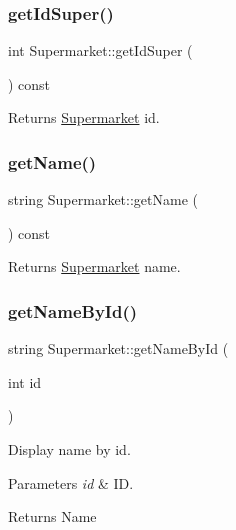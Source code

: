 \subsubsection{\texorpdfstring{get\+Id\+Super()}{getIdSuper()}}
{\footnotesize\ttfamily int Supermarket\+::get\+Id\+Super (\begin{DoxyParamCaption}{ }\end{DoxyParamCaption}) const}

\begin{DoxyReturn}{Returns}
\hyperlink{class_supermarket}{Supermarket} id. 
\end{DoxyReturn}
\mbox{\label{class_supermarket_a917fbd070f9b9740a57d6baedbe57bde}} 
\subsubsection{\texorpdfstring{get\+Name()}{getName()}}
{\footnotesize\ttfamily string Supermarket\+::get\+Name (\begin{DoxyParamCaption}{ }\end{DoxyParamCaption}) const}

\begin{DoxyReturn}{Returns}
\hyperlink{class_supermarket}{Supermarket} name. 
\end{DoxyReturn}
\mbox{\label{class_supermarket_a427143f25488b61db997b693fb9fed4b}} 
\subsubsection{\texorpdfstring{get\+Name\+By\+Id()}{getNameById()}}
{\footnotesize\ttfamily string Supermarket\+::get\+Name\+By\+Id (\begin{DoxyParamCaption}\item[{int}]{id }\end{DoxyParamCaption})}



Display name by id. 


\begin{DoxyParams}{Parameters}
{\em id} & ID.\\
\hline
\end{DoxyParams}
\begin{DoxyReturn}{Returns}
Name 
\end{DoxyReturn}
\mbox{\label{class_supermarket_a1863ad3453bfecefbd203f2a945a92f6}} 
